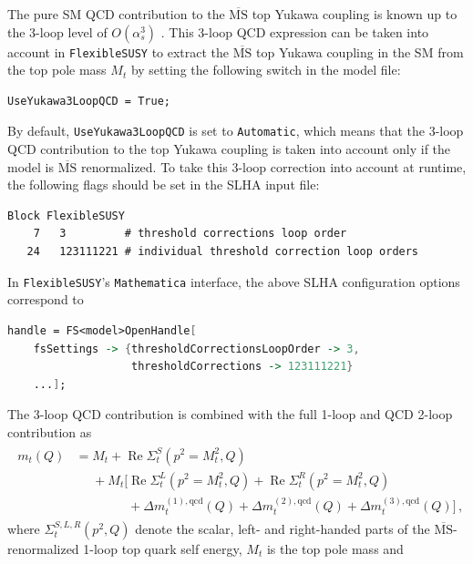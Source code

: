 \documentclass[final,3p,11pt,pdflatex]{elsarticle}
\makeatletter
\newcommand{\fs}{\texttt{FlexibleSUSY}\@\xspace}
\newcommand{\mathematica}{\texttt{Ma\-the\-ma\-ti\-ca}\xspace}
\newcommand{\code}[1]{\lstinline|#1|}  %
\newcommand{\ol}[1]{\overline{#1}}
\newcommand{\MSbar}{\ensuremath{\ol{\text{MS}}}\xspace}
\DeclareMathOperator{\re}{Re}
\def\as{\alpha_s}
\makeatother
\begin{document}
The pure SM QCD contribution to the \MSbar top Yukawa
coupling is known up to the 3-loop level of $O(\as^3)$
\cite{Chetyrkin:1999qi,Melnikov:2000qh}.  This 3-loop QCD expression
can be taken into account in \fs to extract the \MSbar top Yukawa
coupling in the SM from the top pole mass $M_t$ by setting
the following switch in the model file:
%
\begin{lstlisting}
UseYukawa3LoopQCD = True;
\end{lstlisting}
%
By default, \code{UseYukawa3LoopQCD} is set to \code{Automatic}, which
means that the 3-loop QCD contribution to the top Yukawa coupling is
taken into account only if the model is \MSbar renormalized.  To take
this 3-loop correction into account at runtime, the following flags
should be set in the SLHA input file:
%
\\\begin{minipage}{\linewidth}
\begin{lstlisting}
Block FlexibleSUSY
    7   3         # threshold corrections loop order
   24   123111221 # individual threshold correction loop orders
\end{lstlisting}
\end{minipage}
%
In \fs's \mathematica interface, the above SLHA configuration options
correspond to
%
\begin{lstlisting}[language=Mathematica]
handle = FS<model>OpenHandle[
    fsSettings -> {thresholdCorrectionsLoopOrder -> 3,
                   thresholdCorrections -> 123111221}
    ...];
\end{lstlisting}
%
The 3-loop QCD contribution is combined with the full 1-loop and QCD
2-loop contribution as
%
\begin{align}
\begin{split}
  m_t(Q) &= M_t + \re\Sigma_{t}^S(p^2=M_t^2,Q) \\
  &\phantom{={}} + M_t \Big[ \re\Sigma_{t}^L(p^2=M_t^2,Q) +
    \re\Sigma_{t}^R(p^2=M_t^2,Q) \\
  &\phantom{={} + M_t \Big[}
    + \Delta m_t^{(1),\text{qcd}}(Q) + \Delta m_t^{(2),\text{qcd}}(Q) + \Delta m_t^{(3),\text{qcd}}(Q) \Big]
  \,,
\end{split} \label{eq:mt_MSbar}
\end{align}
%
where $\Sigma_t^{S,L,R}(p^2,Q)$ denote the scalar, left- and
right-handed parts of the \MSbar-renormalized 1-loop top quark self
energy, $M_t$ is the top pole mass and
%
\end{document}
